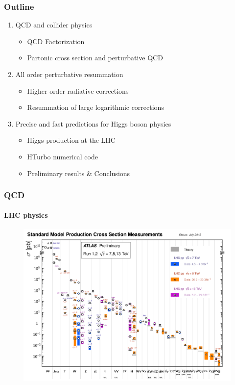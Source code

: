 \documentclass[aspectratio=43]{beamer}
\begin{document}
\begin{frame}

	\frametitle{Outline}
	
	\begin{enumerate}
		\item {\color{blue}QCD and collider physics}
		\begin{itemize}
			\item QCD Factorization
			\item Partonic cross section and perturbative QCD
		\end{itemize}
		\item {\color{blue}All order perturbative resummation}
		\begin{itemize}
			\item Higher order radiative corrections
			\item Resummation of large logarithmic corrections
		\end{itemize}
		\item {\color{blue}Precise and fast predictions for Higgs boson physics}
		\begin{itemize}
			\item Higgs production at the LHC
			\item HTurbo numerical code
			\item Preliminary results $\&$ Conclusions
		\end{itemize}
	\end{enumerate}
	
\end{frame}

\begin{frame}


\end{frame}

\begin{frame}

	\frametitle{QCD}
	\framesubtitle{LHC physics}
	
	\begin{figure}
		\includegraphics[width = 9.5 cm]{plots/lhc_measurements.png}
	\end{figure}

\end{frame}
\end{document}
